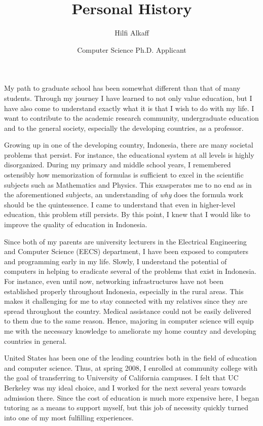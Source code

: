 \documentclass[12pt]{article}
\title{Personal History}
\author{Hilfi Alkaff}
\date{Computer Science Ph.D. Applicant}
\begin{document}
  \maketitle%

My path to graduate school has been somewhat different than that of many students. Through my journey I have learned to not only value education, but I have also come to understand exactly what it is that I wish to do with my life. I want to contribute to the academic research community, undergraduate education and to the general society, especially the developing countries, as a professor. \newline

Growing up in one of the developing country, Indonesia, there are many societal problems that persist. For instance, the educational system at all levels is highly disorganized. During my primary and middle school years, I remembered ostensibly how memorization of formulas is sufficient to excel in the scientific subjects such as Mathematics and Physics. This exasperates me to no end as in the aforementioned subjects, an understanding of \textit{why} does the formula work should be the quintessence. I came to understand that even in higher-level education, this problem still persists. By this point, I knew that I would like to improve the quality of education in Indonesia. \newline

Since both of my parents are university lecturers in the Electrical Engineering and Computer Science (EECS) department, I have been exposed to computers and programming early in my life. Slowly, I understand the potential of computers in helping to eradicate several of the problems that exist in Indonesia. For instance, even until now, networking infrastructures have not been established properly throughout Indonesia, especially in the rural areas. This makes it challenging for me to stay connected with my relatives since they are spread throughout the country. Medical assistance could not be easily delivered to them due to the same reason. Hence, majoring in computer science will equip me with the necessary knowledge to ameliorate my home country and developing countries in general. \newline

United States has been one of the leading countries both in the field of education and computer science. Thus, at spring 2008, I enrolled at community college with the goal of transferring to University of California campuses. I felt that UC Berkeley was my ideal choice, and I worked for the next several years towards admission there. Since the cost of education is much more expensive here, I began tutoring as a means to support myself, but this job of necessity quickly turned into one of my most fulfilling experiences. \newline
\end{document}
